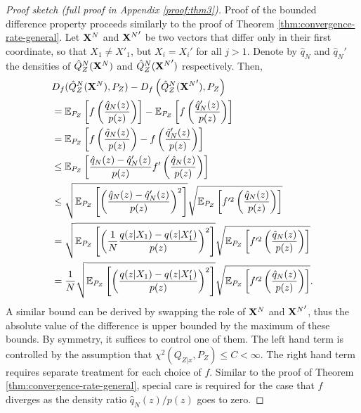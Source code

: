 \begin{proof}[Proof sketch (full proof in Appendix \ref{proof:thm3})]
Proof of the bounded difference property proceeds similarly to the proof of Theorem \ref{thm:convergence-rate-general}.
Let $\mathbf{X}^N$ and ${\mathbf{X}^N}'$ be two vectors that differ only in their first coordinate, so that $X_1 \not=X'_1$, but $X_i =X_i'$ for all $j>1$. 
Denote by $\hat{q}_N$ and $\hat{q}_N'$ the densities of $\hat{Q}_Z^N(\mathbf{X}^N)$ and $\hat{Q}_Z^N({\mathbf{X}^N}')$ respectively.
Then,
%
\begin{align*}
& D_f( \hat{Q}_Z^N(\mathbf{X}^N) , P_Z) - D_f\left( \hat{Q}_Z^N({\mathbf{X}^N}') , P_Z\right) \\
&= \mathbb{E}_{P_Z} \left[ f\left( \frac{\hat{q}_N(z)}{p(z)} \right) \right] - \mathbb{E}_{P_Z} \left[ f\left( \frac{\hat{q}_N'(z)}{p(z)}\right)\right] \\
&= \mathbb{E}_{P_Z} \left[ f\left( \frac{\hat{q}_N(z)}{p(z)} \right) - f\left( \frac{\hat{q}_N'(z)}{p(z)}\right)\right] \\
&\leq \mathbb{E}_{P_Z} \left[ \frac{\hat{q}_N(z) - \hat{q}_N'(z)}{p(z)} f'\left(\frac{\hat{q}_N(z)}{p(z)}\right) \right] \\
&\leq \sqrt{ \mathbb{E}_{P_Z} \left[ \left( \frac{\hat{q}_N(z) - \hat{q}_N'(z)}{p(z)} \right)^2 \right]} \sqrt{ \mathbb{E}_{P_Z} \left[ f'^2\left(\frac{\hat{q}_N(z)}{p(z)}\right) \right]} \\
&= \sqrt{ \mathbb{E}_{P_Z} \left[ \left( \frac{1}{N}\frac{q(z|X_1) - q(z|X_1')}{p(z)} \right)^2 \right]} \sqrt{ \mathbb{E}_{P_Z} \left[ f'^2\left(\frac{\hat{q}_N(z)}{p(z)}\right) \right]} \\
&= \frac{1}{N} \sqrt{ \mathbb{E}_{P_Z} \left[ \left( \frac{q(z|X_1) - q(z|X_1')}{p(z)} \right)^2 \right]} \sqrt{ \mathbb{E}_{P_Z} \left[ f'^2\left(\frac{\hat{q}_N(z)}{p(z)}\right) \right]}.
\end{align*}
%
A similar bound can be derived by swapping the role of $\mathbf{X}^N$ and ${\mathbf{X}^N}'$, thus the absolute value of the difference is upper bounded by the maximum of these bounds.
By symmetry, it suffices to control one of them.
The left hand term is controlled by the assumption that ${\chi^2\left(Q_{Z|x} , P_Z\right) \leq C < \infty}$.
The right hand term requires separate treatment for each choice of $f$. 
Similar to the proof of Theorem \ref{thm:convergence-rate-general}, special care is required for the case that $f$ diverges as the density ratio $\hat{q}_N(z)/p(z)$ goes to zero.
\end{proof}

